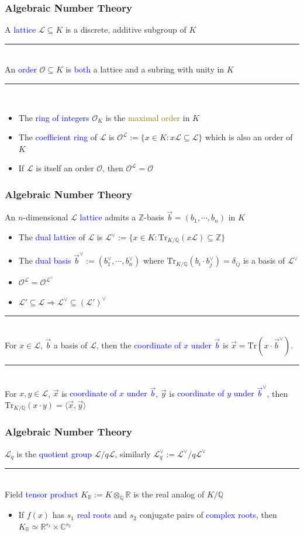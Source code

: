\documentclass{beamer}
\newcommand{\blue}[1]{\textcolor{blue}{#1}}
\newcommand{\dgreen}[1]{\textcolor{dgreen}{#1}}
\newcommand{\olive}[1]{\textcolor{olive}{#1}}
\newcommand{\cL}{\mathcal{L}}
\newcommand{\cO}{\mathcal{O}}
\newcommand{\bbC}{\mathbb{C}}
\newcommand{\bbQ}{\mathbb{Q}}
\newcommand{\bbR}{\mathbb{R}}
\newcommand{\bbZ}{\mathbb{Z}}
\newcommand{\Tr}{\mathrm{Tr}}
\newcommand{\TrKQ}{\mathrm{Tr}_{K/\mathbb{Q}}}
\newcommand{\cOL}{\mathcal{O}^{\mathcal{L}}}
\newcommand{\cLV}{\mathcal{L}^{\vee}}
\newcommand{\cLpV}{(\mathcal{L'})^{\vee}}
\newcommand{\KR}{K_{\mathbb{R}}}
\newcommand{\vb}{\vec{b}}
\newcommand{\vx}{\vec{x}}
\newcommand{\vy}{\vec{y}}
\newcommand{\vbV}{\vec{b}^{\vee}}
\newcommand{\divline}{\noindent\rule{6cm}{0.4pt}}
\begin{document}
\frame
{
  \frametitle{Algebraic Number Theory}
  A \blue{lattice} $\cL\subseteq K$ is a \dgreen{discrete}, \dgreen{additive subgroup} of $K$

  \noindent\rule{6cm}{0.4pt}\\
  An \blue{order} $\cO\subseteq K$ is \blue{both} a \dgreen{lattice} and a \dgreen{subring with unity} in $K$

  \noindent\rule{6cm}{0.4pt}\\
  \begin{itemize}
  	\item The \blue{ring of integers} $\cO_K$ is the \olive{maximal order} in $K$
  	\item The \blue{coefficient ring} of $\cL$ is $\cOL:=\{x\in K:x\cL\subseteq\cL\}$ which is \dgreen{also an order} of $K$
  	\item If $\cL$ is itself an order $\cO$, then $\cOL=\cO$
  \end{itemize}
}

\frame
{
  \frametitle{Algebraic Number Theory}
  An $n$-dimensional $\cL$ \blue{lattice} admits a \dgreen{$\bbZ$-basis} $\vb=(b_1,\cdots,b_n)$ in $K$
  \begin{itemize}
  	\item The \blue{dual lattice} of $\cL$ is $\cLV:=\{x\in K:\TrKQ(x\cL)\subseteq\bbZ\}$
  	\item The \blue{dual basis} $\vbV:=(b_1^{\vee},\cdots,b_n^{\vee})$ where $\TrKQ(b_i\cdot b_j^{\vee})=\delta_{ij}$ \dgreen{is a basis of} $\cLV$
  	\item $\cOL=\cO^{\cLV}$
  	\item $\cL'\subseteq\cL\Rightarrow\cL^{\vee}\subseteq\cLpV$
  \end{itemize}

  \divline\\

  For $x\in\cL$, $\vb$ a basis of $\cL$, then the \blue{coordinate of $x$ under $\vb$} is $\vx=\Tr(x\cdot\vbV)$.

  \divline\\

  For $x,y\in\cL$, $\vx$ is \blue{coordinate of $x$ under $\vb$}, $\vy$ is \blue{coordinate of $y$ under $\vbV$}, then $\TrKQ(x\cdot y)=\langle\vx,\vy\rangle$
}

\frame
{
  \frametitle{Algebraic Number Theory}
  $\cL_q$ is the \blue{quotient group} $\cL/q\cL$, similarly $\cLV_q:=\cLV/q\cLV$

  \divline\\

  Field \blue{tensor product} $\KR:=K\otimes_{\bbQ}\bbR$ is the \dgreen{real analog} of $K/\bbQ$
  \begin{itemize}
  	\item If $f(x)$ has $s_1$ \blue{real roots} and $s_2$ conjugate pairs of \blue{complex roots}, then $\KR\simeq\bbR^{s_1}\times\bbC^{s_2}$
  \end{itemize}
}
\end{document}
